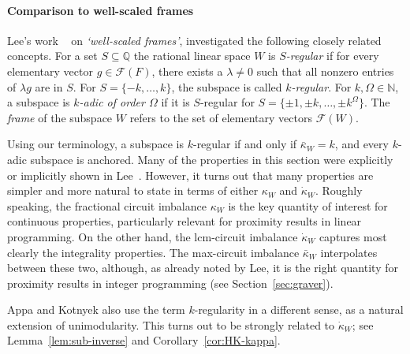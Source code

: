 \documentclass[11pt, a4paper]{article}
\newcommand{\1}{\mathbbm{1}}
\newcommand{\kd}{{\dot{\kappa}}}
\newcommand{\Q}{\mathbb{Q}}
\newcommand{\EE}{\mathcal F}
\theoremstyle{case}
\newcommand{\N}{\mathbb{N}}
\begin{document}
\paragraph{Comparison to well-scaled frames}
Lee's work ~\cite{Lee89} on \emph{`well-scaled frames'},
investigated the following closely related concepts. For a set $S\subseteq \Q$ the rational linear space $W$ is \emph{$S$-regular} if for every elementary vector $g\in \EE(F)$, there exists a $\lambda\neq 0$ such that all nonzero entries of $\lambda g$ are in $S$. For $S=\{-k,\ldots,k\}$, the subspace is called \emph{$k$-regular}. 
For $k,\Omega\in \N$, a subspace is \emph{$k$-adic of order $\Omega$} if it is $S$-regular for $S=\{\pm 1,\pm k,\ldots,\pm k^\Omega\}$. The \emph{frame} of the subspace $W$ refers to the set of elementary vectors $\EE(W)$.

Using our terminology, 
a subspace is $k$-regular if and only if $\bar\kappa_W=k$, and every $k$-adic subspace is anchored. Many of the properties in this section were explicitly or implicitly shown in Lee~\cite{Lee89}. However, it turns out that many  properties are simpler and more natural to state in terms of either $\kappa_W$ and $\dot\kappa_W$. Roughly speaking, the fractional circuit imbalance $\kappa_W$ is the key quantity of interest for continuous properties, particularly relevant for proximity results in linear programming. On the other hand, the lcm-circuit imbalance $\dot\kappa_W$ captures most clearly the integrality properties. The max-circuit imbalance $\bar\kappa_W$ interpolates between these two, although, as already noted by Lee, it is the right quantity for proximity results in integer programming (see Section~\ref{sec:graver}).

Appa and Kotnyek \cite{Appa04} also use the term $k$-regularity in a different sense, as a natural extension of unimodularity. This turns out to be strongly related to $\kd_W$; see Lemma~\ref{lem:sub-inverse} and Corollary~\ref{cor:HK-kappa}.
\end{document}
